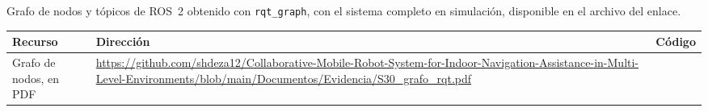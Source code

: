 Grafo de nodos y tópicos de ROS~2 obtenido con \texttt{rqt\_graph}, con el sistema completo en simulación, disponible en el archivo del enlace.

\begin{table}[H]
  \centering\small
  \renewcommand{\arraystretch}{1.3}
  \begin{tabular}{@{}p{} p{} c@{}}
    \toprule
    \textbf{Recurso} & \textbf{Dirección} & \textbf{Código} \\ \midrule
    Grafo de nodos, en PDF & \url{https://github.com/shdeza12/Collaborative-Mobile-Robot-System-for-Indoor-Navigation-Assistance-in-Multi-Level-Environments/blob/main/Documentos/Evidencia/S30_grafo_rqt.pdf} & \raisebox{-0.85\height}{\qrcode[height=2cm]{https://github.com/shdeza12/Collaborative-Mobile-Robot-System-for-Indoor-Navigation-Assistance-in-Multi-Level-Environments/blob/main/Documentos/Evidencia/S30_grafo_rqt.pdf}} \\ \bottomrule
  \end{tabular}
\end{table}
